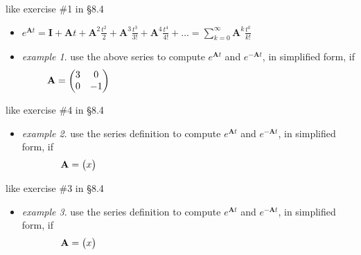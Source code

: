 \documentclass[urlcolor=blue,dvipsnames]{beamer}
\newcommand{\bA}{\mathbf{A}}
\newcommand{\bI}{\mathbf{I}}
\begin{document}
\begin{frame}{like exercise \#1 in \S8.4}

\begin{itemize}
\item $e^{\bA t} = \bI + \bA t + \bA^2 \frac{t^2}{2} + \bA^3 \frac{t^3}{3!} + \bA^4 \frac{t^4}{4!} + \dots = \sum_{k=0}^\infty \bA^k \frac{t^k}{k!}$

\medskip
\item \emph{example 1}.  use the above series to compute $e^{\bA t}$ and $e^{-\bA t}$, in simplified form, if
    $$\bA = \begin{pmatrix} 3 & 0 \\ 0 & -1 \end{pmatrix}     \hspace{80mm}$$
\end{itemize}

\vspace{40mm}
\end{frame}


\begin{frame}{like exercise \#4 in \S8.4}

\begin{itemize}
\item \emph{example 2}.  use the series definition to compute $e^{\bA t}$ and $e^{-\bA t}$, in simplified form, if
    $$\bA = \begin{pmatrix} x \end{pmatrix}     \hspace{80mm}$$
\end{itemize}

\vspace{50mm}
\end{frame}


\begin{frame}{like exercise \#3 in \S8.4}

\begin{itemize}
\item \emph{example 3}.  use the series definition to compute $e^{\bA t}$ and $e^{-\bA t}$, in simplified form, if
    $$\bA = \begin{pmatrix} x \end{pmatrix}     \hspace{80mm}$$
\end{itemize}

\vspace{50mm}
\end{frame}
\end{document}
